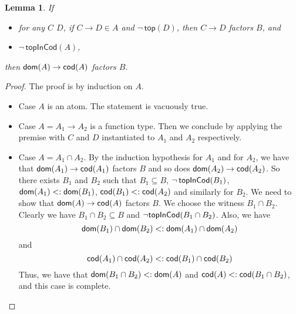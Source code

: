 \documentclass{article}
\newtheorem{lemma}[theorem]{Lemma}
\begin{document}
\begin{lemma}\label{lem:sub-inv-trans}
  If
  \begin{itemize}
  \item for any $C$ $D$, if $C \to D \in A$ and $\neg\,\mathsf{top}(D)$,
    then $C \to D$ factors $B$, and
  \item $\neg\, \mathsf{topInCod}(A)$,
  \end{itemize}
  then $\mathsf{dom}(A) \to \mathsf{cod}(A)$ factors $B$.
\end{lemma}
\begin{proof}
  The proof is by induction on $A$.
  \begin{itemize}
  \item Case $A$ is an atom. The statement is vacuously true.
  \item Case $A = A_1 \to A_2$ is a function type. Then we conclude by applying
    the premise with $C$ and $D$ instantiated to $A_1$ and $A_2$ respectively.
  \item Case $A = A_1 \cap A_2$.  By the induction hypothesis for $A_1$
    and for $A_2$, we have that $\mathsf{dom}(A_1) \to \mathsf{cod}(A_1)$ factors $B$
    and so does $\mathsf{dom}(A_2) \to \mathsf{cod}(A_2)$.  So there exists
    $B_1$ and $B_2$ such that $B_1 \subseteq B$, $\neg\,\mathsf{topInCod}(B_1)$,
    $\mathsf{dom}(A_1) <: \mathsf{dom}(B_1)$, $\mathsf{cod}(B_1) <: \mathsf{cod}(A_2)$ and similarly
    for $B_2$. We need to show that $\mathsf{dom}(A) \to \mathsf{cod}(A)$ factors
    $B$. We choose the witness $B_1 \cap B_2$.  Clearly we have $B_1 \cap
    B_2 \subseteq B$ and $\neg \mathsf{topInCod}(B_1 \cap B_2)$.  Also, we have
    \[
    \mathsf{dom}(B_1) \cap \mathsf{dom}(B_2) <: \mathsf{dom}(A_1) \cap \mathsf{dom}(A_2)
    \]
    and
    \[
    \mathsf{cod}(A_1) \cap \mathsf{cod}(A_2) <: \mathsf{cod}(B_1) \cap \mathsf{cod}(B_2)
    \]
    Thus, we have that $\mathsf{dom}(B_1 \cap B_2) <: \mathsf{dom}(A)$
    and $\mathsf{cod}(A) <: \mathsf{cod}(B_1 \cap B_2)$, and this case is complete.
  \end{itemize}
\end{proof}
\end{document}
